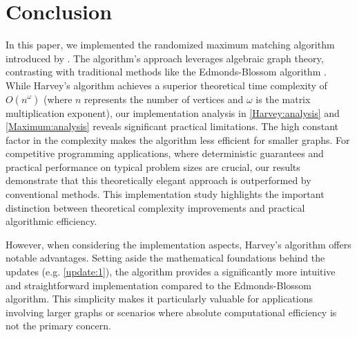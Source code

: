 \chapter{Conclusion}

In this paper, we implemented the randomized maximum matching algorithm introduced by \citet{Harvey:Paper}. 
The algorithm's approach leverages algebraic graph theory, contrasting with traditional methods like the Edmonds-Blossom algorithm \citet{Edmonds}. 
While Harvey's algorithm achieves a superior theoretical time complexity of $O(n^\omega)$ (where $n$ represents the number of vertices and $\omega$ is the matrix multiplication exponent), our implementation analysis in \cref{Harvey:analysis} and \cref{Maximum:analysis} reveals significant practical limitations. 
The high constant factor in the complexity makes the algorithm less efficient for smaller graphs. 
For competitive programming applications, where deterministic guarantees and practical performance on typical problem sizes are crucial, our results demonstrate that this theoretically elegant approach is outperformed by conventional methods. 
This implementation study highlights the important distinction between theoretical complexity improvements and practical algorithmic efficiency.

However, when considering the implementation aspects, Harvey's algorithm offers notable advantages. 
Setting aside the mathematical foundations behind the updates (e.g. \cref{update:1}), the algorithm provides a significantly more intuitive and straightforward implementation compared to the Edmonds-Blossom algorithm. 
This simplicity makes it particularly valuable for applications involving larger graphs or scenarios where absolute computational efficiency is not the primary concern. 
